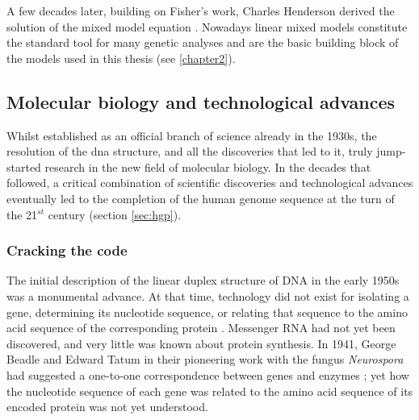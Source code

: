 A few decades later, building on Fisher’s work, Charles Henderson derived the solution of the mixed model equation \cite{henderson1950estimation}. 
Nowadays linear mixed models constitute the standard tool for many genetic analyses and are the basic building block of the models used in this thesis (see 
\ref{chapter2}).

\newpage

\subsection{Molecular biology and technological advances}
\label{sec:genetic_timeline}

Whilst established as an official branch of science already in the 1930s, the resolution of the \gls{dna} structure, and all the discoveries that led to it, truly jump-started research in the new field of molecular biology.
In the decades that followed, a critical combination of scientific discoveries and technological advances eventually led to the completion of the human genome sequence at the turn of the 21$^{st}$ century \cite{nhgri2003genetic} (section \ref{sec:hgp}).

\subsubsection{Cracking the code}

The initial description of the linear duplex structure of DNA in the early 1950s was a monumental advance. 
At that time, technology did not exist for isolating a gene, determining its nucleotide sequence, or relating that sequence to the amino acid sequence of the corresponding protein \cite{yanofsky2007establishing}. 
Messenger RNA had not yet been discovered, and very little was known about protein synthesis. 
In 1941, George Beadle and Edward Tatum in their pioneering work with the fungus \textit{Neurospora} had suggested a one-to-one correspondence between genes and enzymes \cite{beadle1941genetic}; 
yet how the nucleotide sequence of each gene was related to the amino acid sequence of its encoded protein was not yet understood.\\

